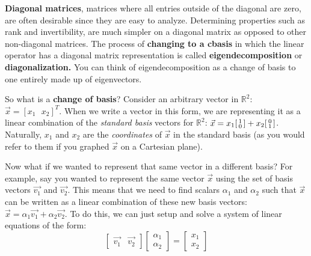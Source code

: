 


\textbf{Diagonal matrices}, matrices where all entries outside of the diagonal are zero, are often desirable since they are easy to analyze.
Determining properties such as rank and invertibility, are much simpler on a diagonal matrix as opposed to other non-diagonal matrices.
The process of \textbf{changing to a cbasis} in which the linear operator has a diagonal matrix representation is called \textbf{eigendecomposition} or \textbf{diagonalization.} You can think of eigendecomposition as a change of basis to one entirely made up of eigenvectors.

So what is a \textbf{change of basis}? Consider an arbitrary vector in $\mathbb{R}^2$: $\vec{x} = [ x_1 \text{ } x_2 ]^T$.
When we write a vector in this form, we are representing it as a linear combination of the \textit{standard basis} vectors for $\mathbb{R}^2$: $\vec{x} = x_1 \begin{bsmallmatrix} 1 \\ 0 \end{bsmallmatrix} + x_2 \begin{bsmallmatrix} 0 \\ 1 \end{bsmallmatrix}$. Naturally, $x_1$ and $x_2$ are the \textit{coordinates} of $\vec{x}$ in the standard basis (as you would refer to them if you graphed $\vec{x}$ on a Cartesian plane).

Now what if we wanted to represent that same vector in a different basis?
For example, say you wanted to represent the same vector $\vec{x}$ using the set of basis vectors $\vec{v_1}$ and $\vec{v_2}$.
This means that we need to find scalars $\alpha_1$ and $\alpha_2$ such that $\vec{x}$ can be written as a linear combination of these new basis vectors: $\vec{x} = \alpha_1 \vec{v_1} + \alpha_2 \vec{v_2}$.
To do this, we can just setup and solve a system of linear equations of the form:
$$\begin{bmatrix} \vec{v_1} & \vec{v_2} \end{bmatrix} \begin{bmatrix} \alpha_1 \\ \alpha_2 \end{bmatrix} = \begin{bmatrix} x_1 \\ x_2 \end{bmatrix}$$

